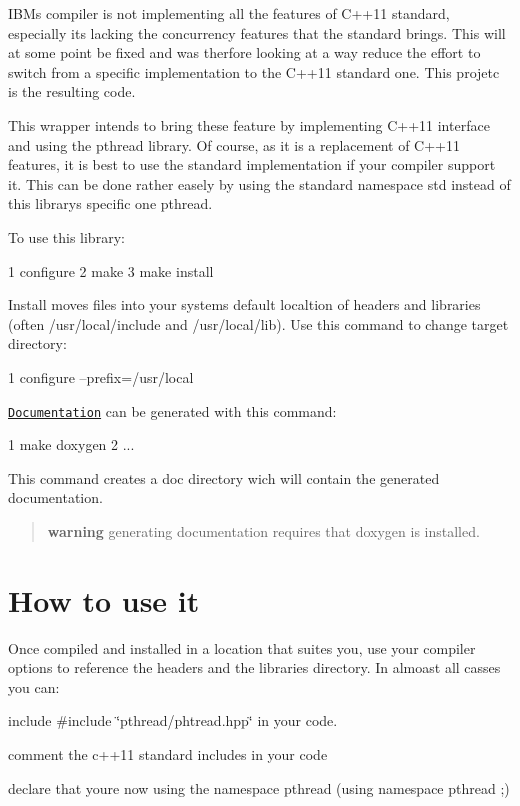I\+BM\textquotesingle{}s compiler is not implementing all the features of C++11 standard, especially it\textquotesingle{}s lacking the concurrency features that the standard brings. This will at some point be fixed and was therfore looking at a way reduce the effort to switch from a specific implementation to the C++11 standard one. This projetc is the resulting code.

This wrapper intends to bring these feature by implementing C++11 interface and using the pthread library. Of course, as it is a replacement of C++11 features, it is best to use the standard implementation if your compiler support it. This can be done rather easely by using the standard namespace {\ttfamily std} instead of this library\textquotesingle{}s specific one {\ttfamily pthread}.

To use this library\+: 
\begin{DoxyCode}
1 configure
2 make
3 make install
\end{DoxyCode}


Install moves files into your system\textquotesingle{}s default localtion of headers and libraries (often /usr/local/include and /usr/local/lib). Use this command to change target directory\+: 
\begin{DoxyCode}
1 configure --prefix=/usr/local
\end{DoxyCode}


\href{http://herbertkoelman.github.io/cpp-pthread/doc/html/}{\tt Documentation} can be generated with this command\+: 
\begin{DoxyCode}
1 make doxygen
2 ...
\end{DoxyCode}


This command creates a {\ttfamily doc} directory wich will contain the generated documentation.

\begin{quote}
{\bfseries warning} generating documentation requires that doxygen is installed. \end{quote}


\section*{How to use it}

Once compiled and installed in a location that suites you, use your compiler options to reference the headers and the libraries directory. In almoast all casses you can\+:
\begin{DoxyItemize}
\item include {\ttfamily \#include \char`\"{}pthread/phtread.\+hpp\char`\"{}} in your code.
\item comment the c++11 standard includes in your code
\item declare that you\textquotesingle{}re now using the namespace pthread ({\ttfamily using namespace pthread ;})
\end{DoxyItemize}

